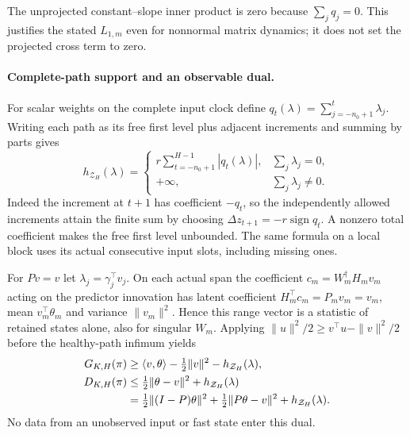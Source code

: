 The unprojected constant--slope inner product is zero because
$\sum_jq_j=0$. This justifies the stated $L_{1,m}$ even for nonnormal
matrix dynamics; it does not set the projected cross term to zero.

\paragraph{Complete-path support and an observable dual.}
For scalar weights on the complete input clock define
$q_t(\lambda)=\sum_{j=-n_0+1}^t\lambda_j$.
Writing each path as its free first level plus adjacent increments and
summing by parts gives
\begin{equation}\label{sf:support}
h_{\mathcal Z_H}(\lambda)=
\begin{cases}
r\displaystyle\sum_{t=-n_0+1}^{H-1}|q_t(\lambda)|,
 &\displaystyle\sum_j\lambda_j=0,\\
+\infty,&\displaystyle\sum_j\lambda_j\ne0.
\end{cases}
\end{equation}
Indeed the increment at $t+1$ has coefficient $-q_t$, so the independently
allowed increments attain the finite sum by choosing
$\Delta z_{t+1}=-r\operatorname{sign}q_t$. A nonzero total coefficient makes
the free first level unbounded. The same formula on a local block uses
its actual consecutive input slots, including missing ones.

For $Pv=v$ let $\lambda_j=\gamma_j^\top v_j$. On each actual span the
coefficient $c_m=W_m^\dagger H_mv_m$ acting on the predictor innovation has
latent coefficient $H_m^\top c_m=P_mv_m=v_m$, mean $v_m^\top\theta_m$
and variance $\|v_m\|^2$. Hence this range vector is a statistic of retained
states alone, also for singular $W_m$. Applying
$\|u\|^2/2\ge v^\top u-\|v\|^2/2$ before the healthy-path infimum yields
\begin{align}
G_{K,H}(\pi)&\ge\langle v,\theta\rangle-\tfrac12\|v\|^2
-h_{\mathcal Z_H}(\lambda),\notag\\
D_{K,H}(\pi)&\le\tfrac12\|\theta-v\|^2+h_{\mathcal Z_H}(\lambda)\notag\\
&=\tfrac12\|(I-P)\theta\|^2+\tfrac12\|P\theta-v\|^2
+h_{\mathcal Z_H}(\lambda).
\label{sf:dual}
\end{align}
No data from an unobserved input or fast state enter this dual.
